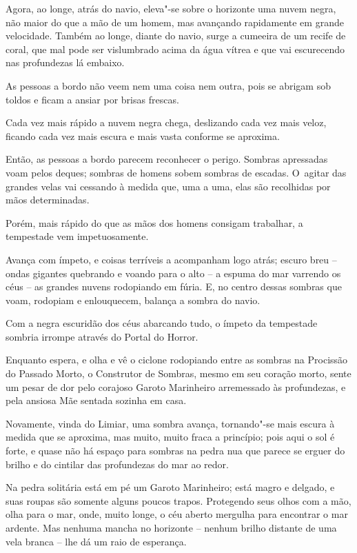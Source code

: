 Agora, ao longe, atrás do navio, eleva"-se sobre o horizonte uma nuvem
negra, não maior do que a mão de um homem, mas avançando rapidamente em
grande velocidade. Também ao longe, diante do navio, surge a cumeeira de
um recife de coral, que mal pode ser vislumbrado acima da água vítrea e que 
vai escurecendo nas profundezas lá embaixo.

As pessoas a bordo não veem nem uma coisa nem outra, pois se abrigam sob
toldos e ficam a ansiar por brisas frescas.

Cada vez mais rápido a nuvem negra chega, deslizando cada vez mais veloz,
ficando cada vez mais escura e mais vasta conforme se aproxima.

Então, as pessoas a bordo parecem reconhecer o perigo. Sombras
apressadas voam pelos deques; sombras de homens sobem sombras de
escadas. O~agitar das grandes velas vai cessando à medida que, uma a
uma, elas são recolhidas por mãos determinadas.

Porém, mais rápido do que as mãos dos homens consigam trabalhar, a tempestade
vem impetuosamente.

Avança com ímpeto, e coisas terríveis a acompanham logo atrás; escuro breu --
ondas gigantes quebrando e voando para o alto -- a espuma do mar
varrendo os céus -- as grandes nuvens rodopiando em fúria. E, no centro
dessas sombras que voam, rodopiam e enlouquecem, balança a sombra do
navio.

Com a negra escuridão dos céus abarcando tudo, o ímpeto da tempestade
sombria irrompe através do Portal do Horror.

Enquanto espera, e olha e vê o ciclone rodopiando entre as sombras na
Procissão do Passado Morto, o Construtor de Sombras, mesmo em seu
coração morto, sente um pesar de dor pelo corajoso Garoto Marinheiro
arremessado às profundezas, e pela ansiosa Mãe sentada sozinha em casa.

\smallskip
Novamente, vinda do Limiar, uma sombra avança, tornando"-se mais escura à
medida que se aproxima, mas muito, muito fraca a princípio; pois aqui o
sol é forte, e quase não há espaço para sombras na pedra nua que parece
se erguer do brilho e do cintilar das profundezas do mar ao redor.

Na pedra solitária está em pé um Garoto Marinheiro; está magro e
delgado, e suas roupas são somente alguns poucos trapos. Protegendo seus
olhos com a mão, olha para o mar, onde, muito longe, o céu aberto
mergulha para encontrar o mar ardente. Mas nenhuma mancha no horizonte
-- nenhum brilho distante de uma vela branca -- lhe dá um raio de
esperança.

